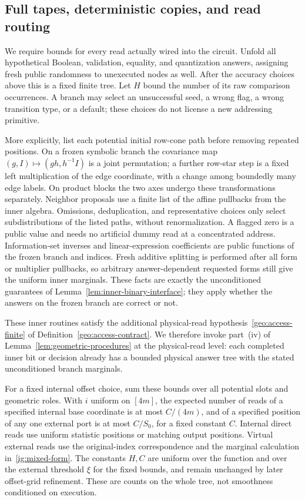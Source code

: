 \subsection{Full tapes, deterministic copies, and read routing}

We require bounds for every read actually wired into the circuit. Unfold
all hypothetical Boolean, validation, equality, and quantization answers,
assigning fresh public randomness to unexecuted nodes as well. After the
accuracy choices above this is a fixed finite tree. Let $H$ bound the
number of its raw comparison occurrences. A branch may select an
unsuccessful seed, a wrong flag, a wrong transition type, or a default;
these choices do not license a new addressing primitive.

More explicitly, list each potential initial row-cone path before
removing repeated positions. On a frozen symbolic branch the covariance
map $(g,I)\mapsto(gh,h^{-1}I)$ is a joint permutation; a further row-star
step is a fixed left multiplication of the edge coordinate, with a change
among boundedly many edge labels. On product blocks the two axes undergo
these transformations separately. Neighbor proposals use a finite list
of the affine pullbacks from the inner algebra. Omissions, deduplication,
and representative choices only select subdistributions of the listed
paths, without renormalization. A flagged zero is a public value and
needs no artificial dummy read at a concentrated address. Information-set
inverses and linear-expression coefficients are public functions of the
frozen branch and indices. Fresh additive splitting is performed after
all form or multiplier pullbacks, so arbitrary answer-dependent requested
forms still give the uniform inner marginals. These facts are exactly
the unconditioned guarantees of
Lemma~\ref{lem:inner-binary-interface}; they apply whether the answers
on the frozen branch are correct or not.

These inner routines satisfy the additional physical-read
hypothesis~\ref{geo:access-finite} of
Definition~\ref{geo:access-contract}. We therefore invoke part~(iv) of
Lemma~\ref{lem:geometric-procedures} at the physical-read level: each
completed inner bit or decision already has a bounded physical answer
tree with the stated unconditioned branch marginals.

For a fixed internal offset choice, sum these bounds over all potential
slots and geometric roles. With $i$ uniform on $[4m]$, the expected number
of reads of a specified internal base coordinate is at most $C/(4m)$,
and of a specified position of any one external port is at most $C/S_0$,
for a fixed constant $C$. Internal direct reads use uniform statistic
positions or matching output positions. Virtual external reads use the
original-index correspondence and the marginal calculation
in~\eqref{ig:mixed-form}. The constants $H,C$ are uniform over the
function and over the external threshold $\xi$ for the fixed bounds,
and remain unchanged by later offset-grid refinement. These are counts
on the whole tree, not smoothness conditioned on execution.

